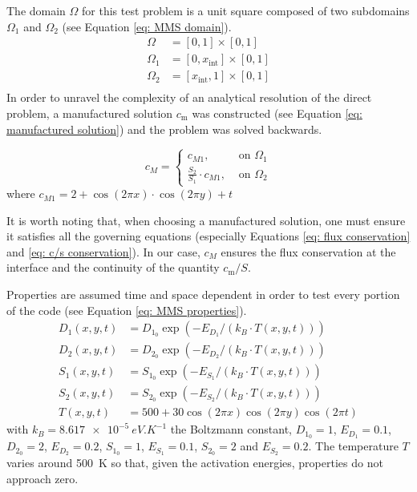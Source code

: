 The domain $\Omega$ for this test problem is a unit square composed of two subdomains $\Omega_1$ and $\Omega_2$ (see Equation \ref{eq: MMS domain}).
\begin{subequations} \label{eq: MMS domain}
\begin{align}
    \Omega &= [0, 1] \times [0, 1] \\
    \Omega_1 &= [0, x_\mathrm{int}] \times [0, 1] \\
    \Omega_2 &= [x_\mathrm{int}, 1] \times [0, 1] \\
\end{align}
\end{subequations}
In order to unravel the complexity of an analytical resolution of the direct problem, a manufactured solution $c_\mathrm{m}$ was constructed (see Equation \ref{eq: manufactured solution}) and the problem was solved backwards.

\begin{equation}
        c_M= 
\begin{cases}
    c_{M1},& \text{ on } \Omega_1\\
    \frac{S_2}{S_1} \cdot c_{M1},& \text{ on } \Omega_2
\end{cases}
\label{eq: manufactured solution}
\end{equation}
where $c_{M1} = 2 + \cos(2\pi x) \cdot \cos(2\pi y) + t$

It is worth noting that, when choosing a manufactured solution, one must ensure it satisfies all the governing equations (especially Equations \ref{eq: flux conservation} and \ref{eq: c/s conservation}).
In our case, $c_M$ ensures the flux conservation at the interface and the continuity of the quantity $c_\mathrm{m}/S$.

Properties are assumed time and space dependent in order to test every portion of the code (see Equation \ref{eq: MMS properties}).
\begin{subequations}
    \begin{align}
        D_1(x, y, t) & =  D_{1_0} \exp(-E_{D_1}/(k_B \cdot T(x,y, t) )) \\
        D_2(x, y, t) & =  D_{2_0} \exp(-E_{D_2}/(k_B \cdot T(x,y, t) )) \\
        S_1(x, y, t) & =  S_{1_0} \exp(-E_{S_1}/(k_B \cdot T(x,y, t) )) \\
        S_2(x, y, t) & =  S_{2_0} \exp(-E_{S_2}/(k_B \cdot T(x,y, t) )) \\
        T(x, y, t) & = 500 + 30 \cos(2\pi x) \cos(2 \pi y) \cos(2 \pi t)
\end{align} \label{eq: MMS properties}
\end{subequations}
with ${k_B = \SI{8.617e-5}{eV.K^{-1}}}$ the Boltzmann constant, $D_{1_0} = 1$, $E_{D_1} = 0.1$, $D_{2_0} = 2$, $E_{D_2} = 0.2$, $S_{1_0} = 1$, $E_{S_1} = 0.1$, $S_{2_0} = 2$ and $E_{S_2} = 0.2$.
The temperature $T$ varies around \SI{500}{K} so that, given the activation energies, properties do not approach zero.

